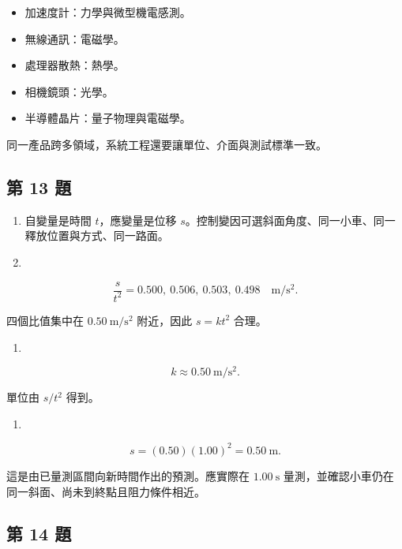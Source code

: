 \documentclass[11pt,a4paper]{article}
\providecommand{\tightlist}{%
  \setlength{\itemsep}{0pt}\setlength{\parskip}{0pt}}
\begin{document}
\begin{itemize}
\tightlist
\item
  加速度計：力學與微型機電感測。
\item
  無線通訊：電磁學。
\item
  處理器散熱：熱學。
\item
  相機鏡頭：光學。
\item
  半導體晶片：量子物理與電磁學。
\end{itemize}

同一產品跨多領域，系統工程還要讓單位、介面與測試標準一致。

\subsection{第 13 題}\label{ux7b2c-13-ux984c}

\begin{enumerate}
\def\labelenumi{(\arabic{enumi})}
\item
  自變量是時間 \(t\)，應變量是位移 \(s\)。控制變因可選斜面角度、同一小車、同一釋放位置與方式、同一路面。
\item
\end{enumerate}

\[
\frac{s}{t^2}
=0.500,\ 0.506,\ 0.503,\ 0.498
\quad\mathrm{m/s^2}.
\]

四個比值集中在 \(0.50\ \mathrm{m/s^2}\) 附近，因此 \(s=kt^2\) 合理。

\begin{enumerate}
\def\labelenumi{(\arabic{enumi})}
\setcounter{enumi}{2}
\tightlist
\item
\end{enumerate}

\[
k\approx0.50\ \mathrm{m/s^2}.
\]

單位由 \(s/t^2\) 得到。

\begin{enumerate}
\def\labelenumi{(\arabic{enumi})}
\setcounter{enumi}{3}
\tightlist
\item
\end{enumerate}

\[
s=(0.50)(1.00)^2
=0.50\ \mathrm m.
\]

這是由已量測區間向新時間作出的預測。應實際在 \(1.00\ \mathrm s\) 量測，並確認小車仍在同一斜面、尚未到終點且阻力條件相近。

\subsection{第 14 題}\label{ux7b2c-14-ux984c}
\end{document}
